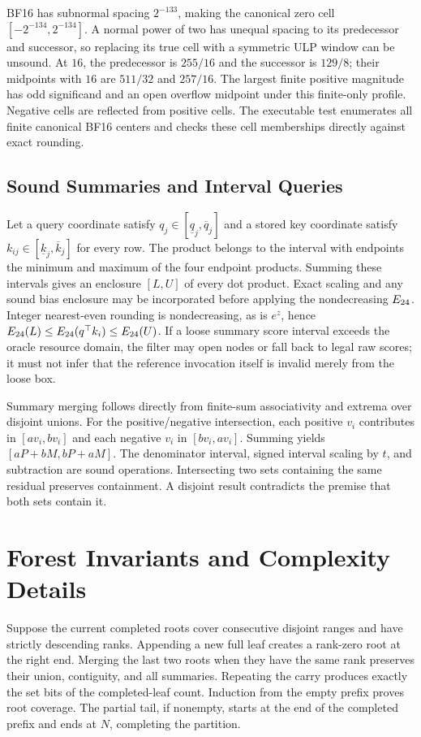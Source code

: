 BF16 has subnormal spacing $2^{-133}$, making the canonical zero cell
$[-2^{-134},2^{-134}]$. A normal power of two has unequal spacing to its
predecessor and successor, so replacing its true cell with a symmetric ULP
window can be unsound. At $16$, the predecessor is $255/16$ and the
successor is $129/8$; their midpoints with $16$ are $511/32$ and
$257/16$. The largest finite positive magnitude has odd significand and
an open overflow midpoint under this finite-only profile. Negative cells
are reflected from positive cells. The executable test enumerates all
finite canonical BF16 centers and checks these cell memberships directly
against exact rounding.

\subsection{Sound Summaries and Interval Queries}

Let a query coordinate satisfy $q_j\in[\underline q_j,\overline q_j]$
and a stored key coordinate satisfy
$k_{ij}\in[\underline k_j,\overline k_j]$ for every row. The product
belongs to the interval with endpoints the minimum and maximum of the four
endpoint products. Summing these intervals gives an enclosure $[L,U]$
of every dot product. Exact scaling and any sound bias enclosure may be
incorporated before applying the nondecreasing $E_{24}$. Integer nearest-even
rounding is nondecreasing, as is $e^z$, hence $E_{24}(L)\le E_{24}(q^\top
k_i)\le E_{24}(U)$. If a loose summary score interval exceeds the oracle
resource domain, the filter may open nodes or fall back to legal raw scores;
it must not infer that the reference invocation itself is invalid merely
from the loose box.

Summary merging follows directly from finite-sum associativity and extrema
over disjoint unions. For the positive/negative intersection, each positive
$v_i$ contributes in $[av_i,bv_i]$ and each negative $v_i$ in
$[bv_i,av_i]$. Summing yields $[aP+bM,bP+aM]$. The denominator interval,
signed interval scaling by $t$, and subtraction are sound operations.
Intersecting two sets containing the same residual preserves containment.
A disjoint result contradicts the premise that both sets contain it.

\section{Forest Invariants and Complexity Details}

Suppose the current completed roots cover consecutive disjoint ranges and
have strictly descending ranks. Appending a new full leaf creates a rank-zero
root at the right end. Merging the last two roots when they have the same
rank preserves their union, contiguity, and all summaries. Repeating the
carry produces exactly the set bits of the completed-leaf count. Induction
from the empty prefix proves root coverage. The partial tail, if nonempty,
starts at the end of the completed prefix and ends at $N$, completing the
partition.

